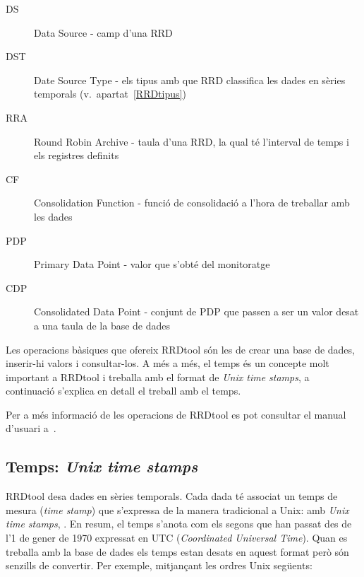 \begin{description}
\item[DS] Data Source - camp d'una RRD
\item[DST] Date Source Type - els tipus amb que RRD classifica les dades en sèries temporals (v.\ apartat~\ref{RRDtipus})
\item[RRA] Round Robin Archive - taula d'una RRD, la qual té l'interval de temps i els registres definits
\item[CF] Consolidation Function - funció de consolidació a l'hora de treballar amb les dades
\item[PDP] Primary Data Point - valor que s'obté del monitoratge
\item[CDP] Consolidated Data Point - conjunt de PDP que passen a ser un valor desat a una taula de la base de dades
\end{description}


Les operacions bàsiques que ofereix RRDtool són les de crear una base de dades, inserir-hi valors i consultar-los. A més a més, el temps és un concepte molt important a RRDtool i treballa amb el format de \emph{Unix time stamps}, a continuació s'explica en detall el treball amb el temps.

Per a més informació de les operacions de RRDtool es pot consultar el manual d'usuari a~\cite{rrdtool}.

\subsection{Temps: \emph{Unix time stamps}}\label{utc}
RRDtool desa dades en sèries temporals. Cada dada té associat un temps de mesura (\emph{time stamp}) que s'expressa de la manera tradicional a Unix: amb \emph{Unix time stamps}, \cite{wiki:unixtimestamps}. En resum, el temps s'anota com els segons que han passat des de l'1 de gener de 1970 expressat en UTC (\emph{Coordinated Universal Time}).
Quan es treballa amb la base de dades els temps estan desats en aquest format però són senzills de convertir. Per exemple, mitjançant les ordres Unix següents:

